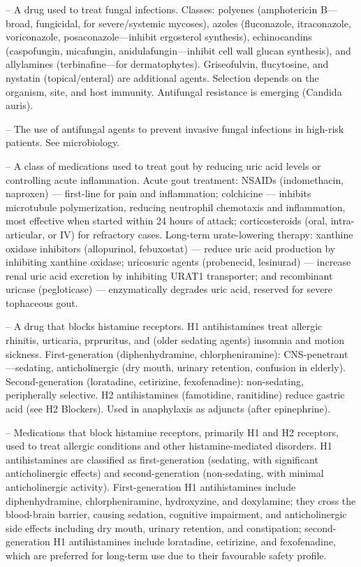 -- A drug used to treat fungal infections. Classes: polyenes (amphotericin B—broad, fungicidal, for severe/systemic mycoses), azoles (fluconazole, itraconazole, voriconazole, posaconazole—inhibit ergosterol synthesis), echinocandins (caspofungin, micafungin, anidulafungin—inhibit cell wall glucan synthesis), and allylamines (terbinafine—for dermatophytes). Griseofulvin, flucytosine, and nystatin (topical/enteral) are additional agents. Selection depends on the organism, site, and host immunity. Antifungal resistance is emerging (Candida auris).

-- The use of antifungal agents to prevent invasive fungal infections in high-risk patients. See microbiology.

-- A class of medications used to treat gout by reducing uric acid levels or controlling acute inflammation. Acute gout treatment: NSAIDs (indomethacin, naproxen) — first-line for pain and inflammation; colchicine — inhibits microtubule polymerization, reducing neutrophil chemotaxis and inflammation, most effective when started within 24 hours of attack; corticosteroids (oral, intra-articular, or IV) for refractory cases. Long-term urate-lowering therapy: xanthine oxidase inhibitors (allopurinol, febuxostat) — reduce uric acid production by inhibiting xanthine oxidase; uricosuric agents (probenecid, lesinurad) — increase renal uric acid excretion by inhibiting URAT1 transporter; and recombinant uricase (pegloticase) — enzymatically degrades uric acid, reserved for severe tophaceous gout.

-- A drug that blocks histamine receptors. H1 antihistamines treat allergic rhinitis, urticaria, prpruritus, and (older sedating agents) insomnia and motion sickness. First-generation (diphenhydramine, chlorpheniramine): CNS-penetrant—sedating, anticholinergic (dry mouth, urinary retention, confusion in elderly). Second-generation (loratadine, cetirizine, fexofenadine): non-sedating, peripherally selective. H2 antihistamines (famotidine, ranitidine) reduce gastric acid (see H2 Blockers). Used in anaphylaxis as adjuncts (after epinephrine).

-- Medications that block histamine receptors, primarily H1 and H2 receptors, used to treat allergic conditions and other histamine-mediated disorders. H1 antihistamines are classified as first-generation (sedating, with significant anticholinergic effects) and second-generation (non-sedating, with minimal anticholinergic activity). First-generation H1 antihistamines include diphenhydramine, chlorpheniramine, hydroxyzine, and doxylamine; they cross the blood-brain barrier, causing sedation, cognitive impairment, and anticholinergic side effects including dry mouth, urinary retention, and constipation; second-generation H1 antihistamines include loratadine, cetirizine, and fexofenadine, which are preferred for long-term use due to their favourable safety profile.

